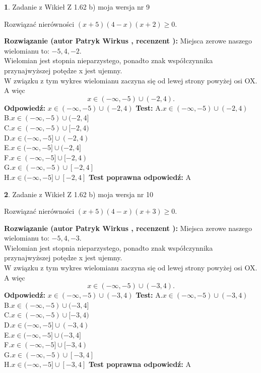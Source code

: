\documentclass[12pt, a4paper]{article}
\theoremstyle{definition} %
\newtheorem{zad}{}
\newcommand{\zadStart}[1]{\begin{zad}#1\newline}
\newcommand{\zadStop}{\end{zad}}
\newcommand{\rozwStart}[2]{\noindent \textbf{Rozwiązanie (autor #1 , recenzent #2): }\newline}
\newcommand{\rozwStop}{\newline}
\newcommand{\odpStart}{\noindent \textbf{Odpowiedź:}\newline}
\newcommand{\odpStop}{\newline}
\newcommand{\testStart}{\noindent \textbf{Test:}\newline}
\newcommand{\testStop}{\newline}
\newcommand{\kluczStart}{\noindent \textbf{Test poprawna odpowiedź:}\newline}
\newcommand{\kluczStop}{\newline}
\begin{document}
\zadStart{Zadanie z Wikieł Z 1.62 b) moja wersja nr 9}

Rozwiązać nierówności $(x+5)(4-x)(x+2)\ge0$.
\zadStop
\rozwStart{Patryk Wirkus}{}
Miejsca zerowe naszego wielomianu to: $-5, 4, -2$.\\
Wielomian jest stopnia nieparzystego, ponadto znak współczynnika przy\linebreak najwyższej potędze x jest ujemny.\\ W związku z tym wykres wielomianu zaczyna się od lewej strony powyżej osi OX. A więc $$x \in (-\infty,-5) \cup (-2,4).$$
\rozwStop
\odpStart
$x \in (-\infty,-5) \cup (-2,4)$
\odpStop
\testStart
A.$x \in (-\infty,-5) \cup (-2,4)$\\
B.$x \in (-\infty,-5) \cup (-2,4]$\\
C.$x \in (-\infty,-5) \cup [-2,4)$\\
D.$x \in (-\infty,-5] \cup (-2,4)$\\
E.$x \in (-\infty,-5] \cup (-2,4]$\\
F.$x \in (-\infty,-5] \cup [-2,4)$\\
G.$x \in (-\infty,-5) \cup [-2,4]$\\
H.$x \in (-\infty,-5] \cup [-2,4]$
\testStop
\kluczStart
A
\kluczStop



\zadStart{Zadanie z Wikieł Z 1.62 b) moja wersja nr 10}

Rozwiązać nierówności $(x+5)(4-x)(x+3)\ge0$.
\zadStop
\rozwStart{Patryk Wirkus}{}
Miejsca zerowe naszego wielomianu to: $-5, 4, -3$.\\
Wielomian jest stopnia nieparzystego, ponadto znak współczynnika przy\linebreak najwyższej potędze x jest ujemny.\\ W związku z tym wykres wielomianu zaczyna się od lewej strony powyżej osi OX. A więc $$x \in (-\infty,-5) \cup (-3,4).$$
\rozwStop
\odpStart
$x \in (-\infty,-5) \cup (-3,4)$
\odpStop
\testStart
A.$x \in (-\infty,-5) \cup (-3,4)$\\
B.$x \in (-\infty,-5) \cup (-3,4]$\\
C.$x \in (-\infty,-5) \cup [-3,4)$\\
D.$x \in (-\infty,-5] \cup (-3,4)$\\
E.$x \in (-\infty,-5] \cup (-3,4]$\\
F.$x \in (-\infty,-5] \cup [-3,4)$\\
G.$x \in (-\infty,-5) \cup [-3,4]$\\
H.$x \in (-\infty,-5] \cup [-3,4]$
\testStop
\kluczStart
A
\kluczStop
\end{document}
